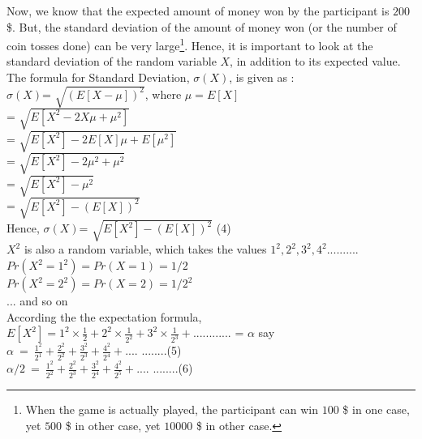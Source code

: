 \documentclass{llncs}
\begin{document}
Now, we know that the expected amount of money won by the participant is $200$ \$. But, the standard deviation of the amount of money won (or the number of coin tosses done) can be very large\footnote{When the game is actually played, the participant can win $100$ \$ in one case, yet $500$ \$ in other case, yet $10000$ \$ in other case.}. Hence, it is important to look at the standard deviation of the random variable $X$, in addition to its expected value.\\

The formula for Standard Deviation, $\sigma(X)$, is given as :\\ 

$\sigma(X)$= $ \sqrt{(E[X- \mu])^2} $, where $\mu = E[X]$\\


= $ \sqrt{E[X^2 - 2 X \mu + \mu ^ 2]} $\\

= $ \sqrt{E[X^2 ]- 2 E[X] \mu + E[\mu ^ 2]} $\\

= $ \sqrt{E[X^2 ]- 2 \mu^2 + \mu ^ 2} $\\

= $ \sqrt{E[X^2 ]- \mu ^ 2} $\\

= $ \sqrt{E[X^2 ]- (E[X]) ^ 2} $\\

Hence, $\sigma(X)$=  $ \sqrt{E[X^2 ]- (E[X]) ^ 2} $	(4)\\

$X^2$ is also a random variable, which takes the values $1^2, 2^2, 3^2, 4^2..........$\\

$Pr(X^2=1^2) = Pr(X=1) = 1/2$\\

$Pr(X^2=2^2) = Pr(X=2) = 1/2^2$\\

... and so on \\

According the the expectation formula, $E[X^2] = 1^2 \times \frac{1}{2} + 2^2 \times \frac{1}{2^2} + 3^2 \times \frac{1}{2^3} + ............  $ = $\alpha$ say\\

$\alpha\ =\ \frac{1^2}{2^1} + \frac{2^2}{2^2} + \frac{3^2}{2^3} + \frac{4^2}{2^4} + .... $   \hspace{5mm} ........(5) \\	


$\alpha/2\ =\ \frac{1^2}{2^2} + \frac{2^2}{2^3} + \frac{3^2}{2^4} + \frac{4^2}{2^5} + .... $   \hspace{5mm} ........(6)  \\
\end{document}
